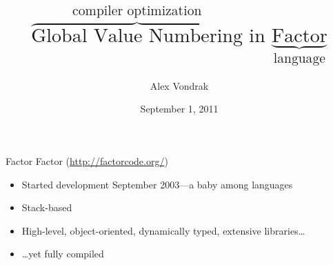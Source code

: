 \documentclass{beamer}
\title[Global Value Numbering in Factor]{$\overbrace{\text{Global Value Numbering}}^{\text{compiler optimization}} \text{~in~} \underbrace{\text{Factor}}_{\text{language}}$}
\author{Alex Vondrak}
\institute{\texttt{ajvondrak@csupomona.edu}}
\date{September 1, 2011}
\begin{document}
\maketitle

\begin{frame}[fragile]{Factor}
  Factor (\url{http://factorcode.org/})
  \begin{itemize}
    \item Started development September 2003---a baby among languages
    \item \alert{Stack-based}
    \begin{example}[1 2 +]
      \centering
      \dostack{+}
    \end{example}
    \item High-level, object-oriented, dynamically typed, extensive libraries\ldots
    \item \ldots yet fully \alert{compiled}
  \end{itemize}
\end{frame}


\end{document}
